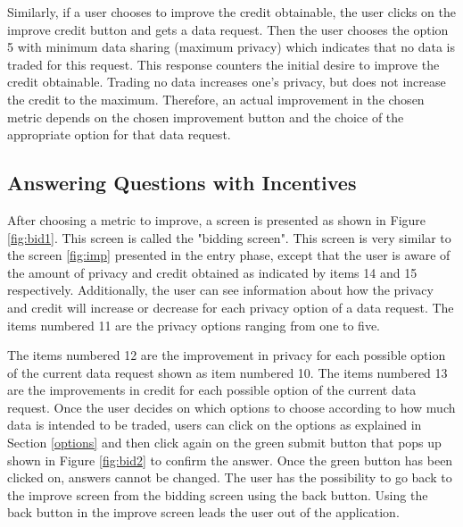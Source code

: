 Similarly, if a user chooses to improve the credit obtainable, the user clicks on the improve credit button and gets a data request. Then the user chooses the option 5 with minimum data sharing (maximum privacy) which indicates that no data is traded for this request. This response counters the initial desire to improve the credit obtainable. Trading no data increases one's privacy, but does not increase the credit to the maximum. Therefore, an actual improvement in the chosen metric depends on the chosen improvement button and the choice of the appropriate option for that data request.

\subsection{Answering Questions with Incentives}

After choosing a metric to improve, a screen is presented as shown in Figure \ref{fig:bid1}.
This screen is called the "bidding screen". This screen is very similar to the screen \ref{fig:imp} presented in the entry phase, except that the user
is aware of the amount of privacy and credit obtained as indicated by items 14 and 15 respectively. Additionally, the user can see information about how the privacy and credit will increase or decrease for each privacy option of a data request. The items numbered 11 are the privacy options ranging from one to five.

The items numbered 12 are the improvement in privacy for each possible option of the current data request shown as item numbered 10. The items numbered 13 are the improvements in credit for each possible option of the current data request. Once the user decides on which options to choose according to how much data is intended to be traded, users can click on the options as explained in Section \ref{options} and then click again on the green submit button that pops up shown in Figure \ref{fig:bid2} to confirm the answer. Once the green button has been clicked on, answers cannot be changed. The user has the possibility to go back to the improve screen from the bidding screen using the back button. Using the back button in the improve screen leads the user out of the application.

